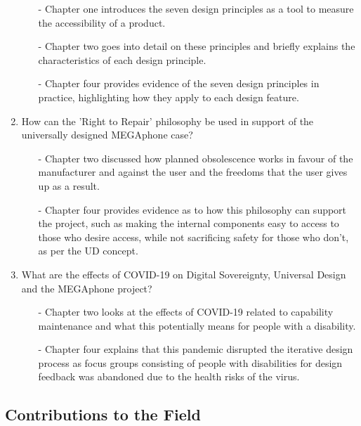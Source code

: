 \begin{enumerate}
        \begin{enumerate}
        \item[-] Chapter one introduces the seven design principles as a tool to measure the accessibility of a product.
        \item[-] Chapter two goes into detail on these principles and briefly explains the characteristics of each design principle.
        \item[-] Chapter four provides evidence of the seven design principles in practice, highlighting how they apply to each design feature.
        \end{enumerate} 
    \item How can the 'Right to Repair' philosophy be used in support of the universally designed MEGAphone case?
        \begin{enumerate}
        \item[-] Chapter two discussed how planned obsolescence works in favour of the manufacturer and against the user and the freedoms that the user gives up as a result.
        \item[-] Chapter four provides evidence as to how this philosophy can support the project, such as making the internal components easy to access to those who desire access, while not sacrificing safety for those who don't, as per the UD concept.
        \end{enumerate} 
    \item What are the effects of COVID-19 on Digital Sovereignty, Universal Design and the MEGAphone project?
        \begin{enumerate}
        \item[-] Chapter two looks at the effects of COVID-19 related to capability maintenance and what this potentially means for people with a disability.
        \item[-] Chapter four explains that this pandemic disrupted the iterative design process as focus groups consisting of people with disabilities for design feedback was abandoned due to the health risks of the virus.
        \end{enumerate} 
\end{enumerate}

\subsection{Contributions to the Field}

